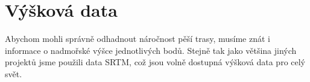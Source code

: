 \chapter{Výšková data}
Abychom mohli správně odhadnout náročnost pěší trasy, musíme znát i informace o
nadmořské výšce jednotlivých bodů. Stejně tak jako většina jiných projektů jsme
použili data SRTM\cite{srtmweb}, což jsou volně dostupná výšková data pro celý
svět. %
